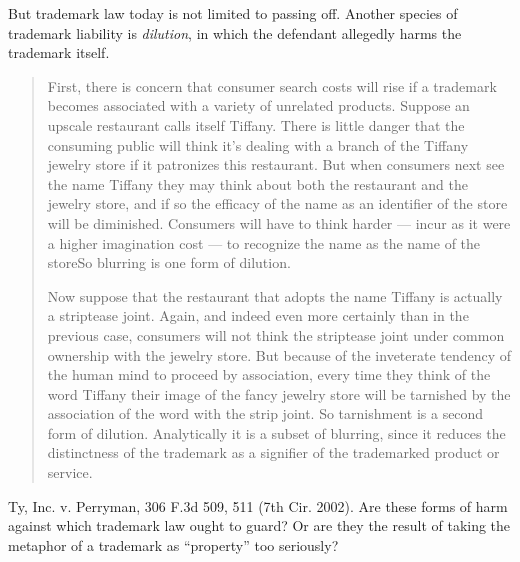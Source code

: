 But trademark law today is not limited to passing off. Another species of
trademark liability is \textit{dilution}, in which the defendant allegedly
harms the trademark itself. 
\begin{quotation}
First, there is concern that consumer search costs will rise if a trademark
becomes associated with a variety of unrelated products. Suppose an upscale
restaurant calls itself {\textquotedbl}Tiffany.{\textquotedbl} There is little
danger that the consuming public will think it's dealing with a branch of the
Tiffany jewelry store if it patronizes this restaurant. But when consumers next
see the name {\textquotedbl}Tiffany{\textquotedbl} they may think about both
the restaurant and the jewelry store, and if so the efficacy of the name as an
identifier of the store will be diminished. Consumers will have to think harder
--- incur as it were a higher imagination cost --- to recognize the name as the
name of the storeSo {\textquotedbl}blurring{\textquotedbl} is one form of
dilution.

Now suppose that the {\textquotedbl}restaurant{\textquotedbl} that adopts the
name {\textquotedbl}Tiffany{\textquotedbl} is actually a striptease joint.
Again, and indeed even more certainly than in the previous case, consumers will
not think the striptease joint under common ownership with the jewelry store.
But because of the inveterate tendency of the human mind to proceed by
association, every time they think of the word
{\textquotedbl}Tiffany{\textquotedbl} their image of the fancy jewelry store
will be tarnished by the association of the word with the strip joint. So
{\textquotedbl}tarnishment{\textquotedbl} is a second form of dilution.
Analytically it is a subset of blurring, since it reduces the distinctness of
the trademark as a signifier of the trademarked product or service.
\end{quotation}
Ty, Inc. v. Perryman, 306 F.3d 509, 511 (7th Cir. 2002). Are these forms of harm
against which trademark law ought to guard? Or are they the result of taking
the metaphor of a trademark as ``property'' too seriously?


